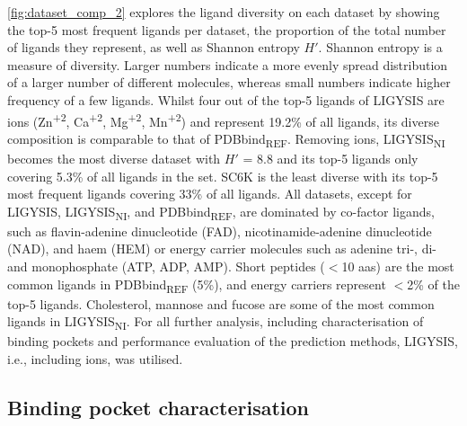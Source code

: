 \autoref{fig:dataset_comp_2} explores the ligand diversity on each dataset by showing the top-5 most frequent ligands per dataset, the proportion of the total number of ligands they represent, as well as Shannon entropy $H'$. Shannon entropy is a measure of diversity. Larger numbers indicate a more evenly spread distribution of a larger number of different molecules, whereas small numbers indicate higher frequency of a few ligands. Whilst four out of the top-5 ligands of LIGYSIS are ions (Zn\textsuperscript{+2}, Ca\textsuperscript{+2}, Mg\textsuperscript{+2}, Mn\textsuperscript{+2}) and represent 19.2\% of all ligands, its diverse composition is comparable to that of PDBbind\textsubscript{REF}. Removing ions, LIGYSIS\textsubscript{NI} becomes the most diverse dataset with $H'$ = 8.8 and its top-5 ligands only covering 5.3\% of all ligands in the set. SC6K is the least diverse with its top-5 most frequent ligands covering 33\% of all ligands. All datasets, except for LIGYSIS, LIGYSIS\textsubscript{NI}, and PDBbind\textsubscript{REF}, are dominated by co-factor ligands, such as flavin-adenine dinucleotide (FAD), nicotinamide-adenine dinucleotide (NAD), and haem (HEM) or energy carrier molecules such as adenine tri-, di- and monophosphate (ATP, ADP, AMP). Short peptides ($<$10 aas) are the most common ligands in PDBbind\textsubscript{REF} (5\%), and energy carriers represent $<$2\% of the top-5 ligands. Cholesterol, mannose and fucose are some of the most common ligands in LIGYSIS\textsubscript{NI}. For all further analysis, including characterisation of binding pockets and performance evaluation of the prediction methods, LIGYSIS, i.e., including ions, was utilised.

\subsection{Binding pocket characterisation}

